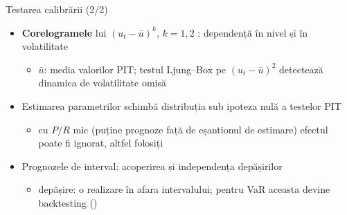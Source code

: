 \begin{frame}{Testarea calibrării (2/2)}
\itemsize{\small}
\begin{itemize}
    \item \textbf{Corelogramele} lui $(u_t - \bar u)^k$, $k = 1, 2$ : dependență în nivel și în volatilitate
    \begin{itemize}
        \item $\bar u$: media valorilor PIT; testul Ljung--Box pe $(u_t - \bar u)^2$ detectează dinamica de volatilitate omisă
    \end{itemize}
    \item Estimarea parametrilor schimbă distribuția sub ipoteza nulă a testelor PIT
    \begin{itemize}
        \item cu $P/R$ mic (puține prognoze față de eșantionul de estimare) efectul poate fi ignorat, altfel folosiți 
    \end{itemize}
    \item Prognozele de interval: acoperirea și independența depășirilor 
    \begin{itemize}
        \item depășire: o realizare în afara intervalului; pentru VaR aceasta devine backtesting ()
    \end{itemize}
\end{itemize}
\end{frame}

